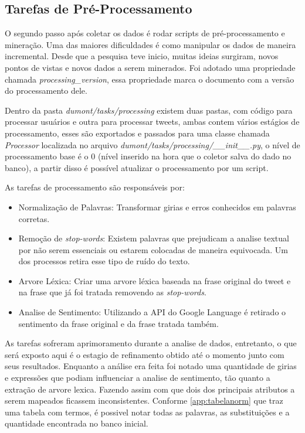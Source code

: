 \subsection{Tarefas de Pré-Processamento}
O segundo passo após coletar os dados é rodar scripts de pré-processamento e mineração. Uma das maiores dificuldades é como manipular os dados de maneira incremental. Desde que a pesquisa teve inicio, muitas ideias surgiram, novos pontos de vistas e novos dados a serem minerados. Foi adotado uma propriedade chamada \textit{processing\_version}, essa propriedade marca o documento com a versão do processamento dele.

Dentro da pasta \textit{dumont/tasks/processing} existem duas pastas, com código para processar usuários e outra para processar tweets, ambas contem vários estágios de processamento, esses são exportados e passados para uma classe chamada \textit{Processor} localizada no arquivo \textit{dumont/tasks/processing/\_\_init\_\_.py}, o nível de processamento base é o 0 (nível inserido na hora que o coletor salva do dado no banco), a partir disso é possível atualizar o processamento por um script.

As tarefas de processamento são responsáveis por:

\begin{itemize}
    \item Normalização de Palavras: Transformar girias e erros conhecidos em palavras corretas.
    \item Remoção de \textit{stop-words}: Existem palavras que prejudicam a analise textual por não serem essenciais ou estarem colocadas de maneira equivocada. Um dos processos retira esse tipo de ruído do texto.
    \item Arvore Léxica: Criar uma arvore léxica baseada na frase original do tweet e na frase que já foi tratada removendo as \textit{stop-words}.
    \item Analise de Sentimento: Utilizando a API do Google Language é retirado o sentimento da frase original e da frase tratada também.
\end{itemize}

As tarefas sofreram aprimoramento durante a analise de dados, entretanto, o que será exposto aqui é o estagio de refinamento obtido até o momento junto com seus resultados. Enquanto a análise era feita foi notado uma quantidade de girias e expressões que podiam influenciar a analise de sentimento, tão quanto a extração de arvore lexica. Fazendo assim com que dois dos principais atributos a serem mapeados ficassem inconsistentes. Conforme \ref{app:tabelanorm} que traz uma tabela com termos, é possivel notar todas as palavras, as substituições e a quantidade encontrada no banco inicial.

